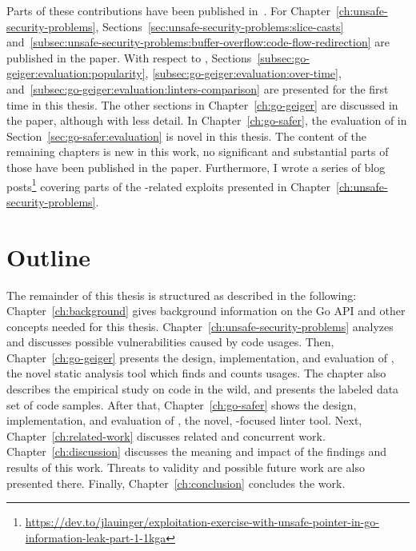 Parts of these contributions have been published in~\cite{lauinger2020}.
For Chapter~\ref{ch:unsafe-security-problems}, Sections~\ref{sec:unsafe-security-problems:slice-casts}
and~\ref{subsec:unsafe-security-problems:buffer-overflow:code-flow-redirection} are published in the paper.
With respect to \toolGeiger{}, Sections~\ref{subsec:go-geiger:evaluation:popularity},
\ref{subsec:go-geiger:evaluation:over-time}, and~\ref{subsec:go-geiger:evaluation:linters-comparison} are presented for
the first time in this thesis.
The other sections in Chapter~\ref{ch:go-geiger} are discussed in the paper, although with less detail.
In Chapter~\ref{ch:go-safer}, the evaluation of \toolSafer{} in Section~\ref{sec:go-safer:evaluation} is novel in this
thesis.
The content of the remaining chapters is new in this work, no significant and substantial parts of those have been
published in the paper.
Furthermore, I wrote a series of blog
posts\footnote{\url{https://dev.to/jlauinger/exploitation-exercise-with-unsafe-pointer-in-go-information-leak-part-1-1kga}}
covering parts of the \unsafe{}-related exploits presented in
Chapter~\ref{ch:unsafe-security-problems}.



\section{Outline}\label{sec:introduction:outline}

The remainder of this thesis is structured as described in the following: Chapter~\ref{ch:background} gives background
information on the Go \unsafe{} \acrshort{API} and other concepts needed for this thesis.
Chapter~\ref{ch:unsafe-security-problems} analyzes and discusses possible vulnerabilities caused by \unsafe{} code
usages.
Then, Chapter~\ref{ch:go-geiger} presents the design, implementation, and evaluation of \toolGeiger, the novel static
analysis tool which finds and counts \unsafe{} usages.
The chapter also describes the empirical study on \unsafe{} code in the wild, and presents the labeled data set of
\unsafe{} code samples.
After that, Chapter~\ref{ch:go-safer} shows the design, implementation, and evaluation of \toolSafer, the novel,
\unsafe{}-focused linter tool.
Next, Chapter~\ref{ch:related-work} discusses related and concurrent work.
Chapter~\ref{ch:discussion} discusses the meaning and impact of the findings and results of this work.
Threats to validity and possible future work are also presented there.
Finally, Chapter~\ref{ch:conclusion} concludes the work.
